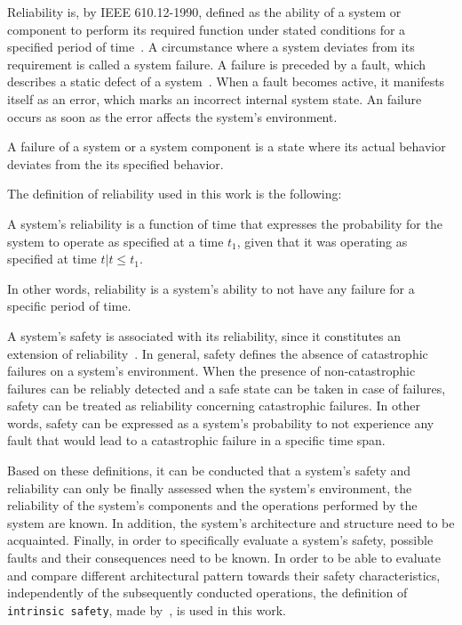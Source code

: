 Reliability is, by IEEE 610.12-1990, defined as the ability of a system or component to perform its required function under stated conditions for a specified period of time~\cite{ieee610.12}.
A circumstance where a system deviates from its requirement is called a system failure.
A failure is preceded by a fault, which describes a static defect of a system~\cite{AmmannOffutt2016}.
When a fault becomes active, it manifests itself as an error, which marks an incorrect internal system state.
An failure occurs as soon as the error affects the system's environment.

\begin{definition}
A failure of a system or a system component is a state where its actual behavior deviates from the its specified behavior.
\end{definition}

The definition of reliability used in this work is the following:

\begin{definition}
\label{def:reliability}
A system's reliability is a function of time that expresses the probability for the system to operate as specified at a time $t_1$, given that it was operating as specified at time $t | t \leq t_1$.
\end{definition}

In other words, reliability is a system's ability to not have any failure for a specific period of time.

A system's safety is associated with its reliability, since it constitutes an extension of reliability~\cite{AvizienisDependability2001}.
In general, safety defines the absence of catastrophic failures on a system's environment.
When the presence of non-catastrophic failures can be reliably detected and a safe state can be taken in case of failures, safety can be treated as reliability concerning catastrophic failures.
In other words, safety can be expressed as a system's probability to not experience any fault that would lead to a catastrophic failure in a specific time span.

Based on these definitions, it can be conducted that a system's safety and reliability can only be finally assessed when the system's environment, the reliability of the system's components and the operations performed by the system are known.
In addition, the system's architecture and structure need to be acquainted.
Finally, in order to specifically evaluate a system's safety, possible faults and their consequences need to be known.
In order to be able to evaluate and compare different architectural pattern towards their safety characteristics, independently of the subsequently conducted operations, the definition of \texttt{intrinsic safety}, made by~\cite{BoulangerStandards}, is used in this work.

